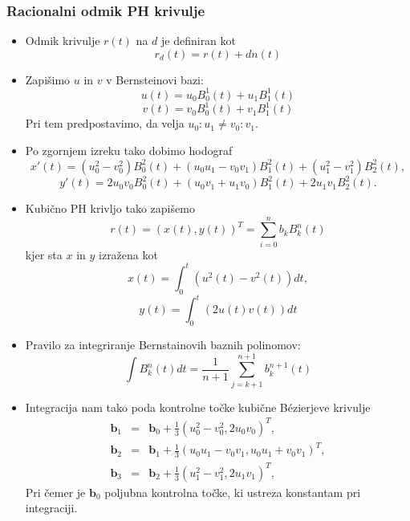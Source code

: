 \documentclass[12pt]{beamer}
\theoremstyle{definition} %
\theoremstyle{plain} %
\begin{document}
\begin{frame}
    \frametitle{Racionalni odmik PH krivulje}
        \begin{itemize}
            \item Odmik krivulje $r(t)$ na  $d$ je definiran kot 
                  $$r_d(t) = r(t) + d n(t)$$
            \item Zapišimo $u$ in $v$ v Bernsteinovi bazi:
                  $$ u(t) = u_0 B_0^1(t) + u_1 B_1^1(t) $$
                  $$ v(t) = v_0 B_0^1(t) + v_1 B_1^1(t) $$
                  Pri tem predpostavimo, da velja $u_0 : u_1 \neq v_0 : v_1$.
            \item Po zgornjem izreku tako dobimo hodograf
                  $$x'(t) = (u_0^2 - v_0^2)B_0^2(t) + (u_0 u_1 - v_0 v_1) B_1^2(t) + (u_1^2 - v_1^2) B_2^2(t),$$
                  $$y'(t) = 2 u_0 v_0 B_0^2(t) + (u_0 v_1 + u_1 v_0) B_1^2(t) + 2 u_1 v_1 B_2^2(t).$$
        \end{itemize}
    \end{frame}
    \begin{frame}
        \begin{itemize}
            \item Kubično PH krivljo tako zapišemo 
                  $$ r(t) = (x(t), y(t))^T = \sum_{i=0}^{n}{b_k B_k^n(t)} $$
                  kjer sta $x$ in $y$ izražena kot
                  $$x(t) = \int_0^t (u^2(t) - v^2(t)) dt,$$
                  $$y(t) = \int_0^t (2u(t)v(t))dt$$
            \item Pravilo za integriranje Bernstainovih baznih polinomov:
                  $$\int B^n_k(t) dt = \frac{1}{n+1} \sum_{j=k+1}^{n+1} b^{n+1}_k(t)$$
        \end{itemize}
    \end{frame}
    
    \begin{frame}
        \begin{itemize}
            \item Integracija nam tako poda kontrolne točke kubične B\'ezierjeve krivulje
                    \begin{eqnarray}
                        \textbf{b}_1 &=& \textbf{b}_0 + \frac{1}{3}(u_0^2 - v_0^2, 2 u_0 v_0)^T,\nonumber\\
                        \textbf{b}_2 &=& \textbf{b}_1 + \frac{1}{3}(u_0 u_1 - v_0 v_1, u_0 u_1 + v_0 v_1)^T,\nonumber\\
                        \textbf{b}_3 &=& \textbf{b}_2 + \frac{1}{3} (u_1^2 - v_1^2, 2 u_1 v_1)^T,\nonumber
                    \end{eqnarray}
                  Pri čemer je $\textbf{b}_0$ poljubna kontrolna točke, ki ustreza konstantam pri integraciji.
        \end{itemize}
    \end{frame}
\end{document}
